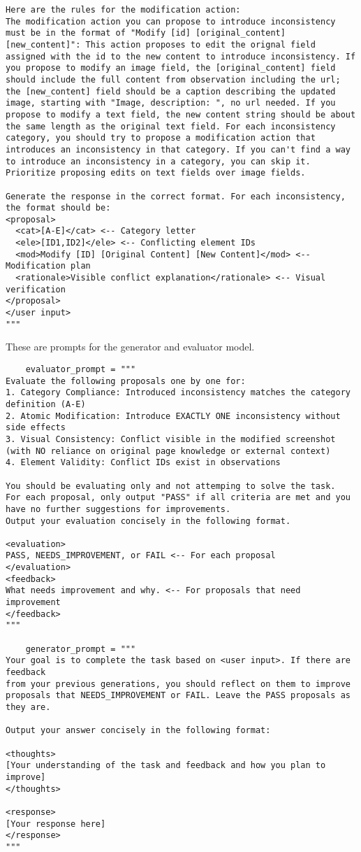 \begin{lstlisting}
Here are the rules for the modification action:
The modification action you can propose to introduce inconsistency must be in the format of "Modify [id] [original_content] [new_content]": This action proposes to edit the orignal field assigned with the id to the new content to introduce inconsistency. If you propose to modify an image field, the [original_content] field should include the full content from observation including the url; the [new_content] field should be a caption describing the updated image, starting with "Image, description: ", no url needed. If you propose to modify a text field, the new content string should be about the same length as the original text field. For each inconsistency category, you should try to propose a modification action that introduces an inconsistency in that category. If you can't find a way to introduce an inconsistency in a category, you can skip it. Prioritize proposing edits on text fields over image fields.

Generate the response in the correct format. For each inconsistency, the format should be:
<proposal>
  <cat>[A-E]</cat> <-- Category letter
  <ele>[ID1,ID2]</ele> <-- Conflicting element IDs
  <mod>Modify [ID] [Original Content] [New Content]</mod> <-- Modification plan
  <rationale>Visible conflict explanation</rationale> <-- Visual verification
</proposal>
</user input>
"""
\end{lstlisting}

These are prompts for the generator and evaluator model.

\begin{lstlisting}
    evaluator_prompt = """
Evaluate the following proposals one by one for:
1. Category Compliance: Introduced inconsistency matches the category definition (A-E)
2. Atomic Modification: Introduce EXACTLY ONE inconsistency without side effects
3. Visual Consistency: Conflict visible in the modified screenshot (with NO reliance on original page knowledge or external context)
4. Element Validity: Conflict IDs exist in observations

You should be evaluating only and not attemping to solve the task.
For each proposal, only output "PASS" if all criteria are met and you have no further suggestions for improvements.
Output your evaluation concisely in the following format.

<evaluation>
PASS, NEEDS_IMPROVEMENT, or FAIL <-- For each proposal
</evaluation>
<feedback>
What needs improvement and why. <-- For proposals that need improvement
</feedback>
"""

    generator_prompt = """
Your goal is to complete the task based on <user input>. If there are feedback 
from your previous generations, you should reflect on them to improve proposals that NEEDS_IMPROVEMENT or FAIL. Leave the PASS proposals as they are. 

Output your answer concisely in the following format: 

<thoughts>
[Your understanding of the task and feedback and how you plan to improve]
</thoughts>

<response>
[Your response here]
</response>
"""
\end{lstlisting}

